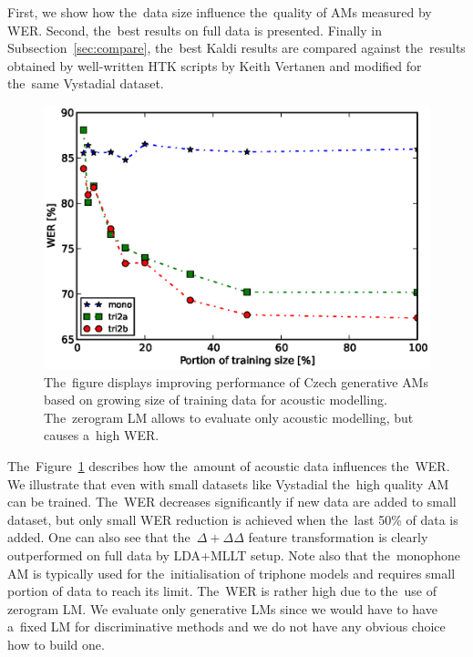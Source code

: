 First, we show how the~data size influence the~quality of \acp{AM} measured by \ac{WER}.
Second,  the~best results on full data is presented.
Finally in Subsection~\ref{sec:compare}, the~best Kaldi results are compared against the~results obtained by well-written \ac{HTK} scripts by Keith Vertanen and modified for the~same Vystadial dataset\cite{korvas_2014}.

\begin{figure}[!htp]
    \begin{center}
    \includegraphics[scale=0.7]{images/partial-zerogram.ps}
    \caption{The~figure displays improving performance of Czech generative \acp{AM} based on growing size of training data for acoustic modelling. The~zerogram \acs{LM} allows to evaluate only acoustic modelling, but causes a~high \acs{WER}. }
    \label{fig:partials} 
    \end{center}
\end{figure}

The~Figure~\ref{fig:partials} describes how the~amount of acoustic data influences the~\ac{WER}.
We illustrate that even with small datasets like Vystadial the~high quality \ac{AM} can be trained.
The~WER decreases significantly if new data are added to small dataset, but only small \ac{WER} reduction is achieved when the~last 50\% of data is added.
One can also see that the~$\Delta+\Delta\Delta$ feature transformation is clearly outperformed on full data by \ac{LDA}+\ac{MLLT} setup.
Note also that the~monophone \ac{AM} is typically used for the~initialisation of triphone models and requires small portion of data to reach its limit.
The~WER is rather high due to the~use of zerogram \ac{LM}.
We evaluate only generative \acp{LM} since we would have to have a~fixed LM for discriminative methods and we do not have any obvious choice how to build one.

